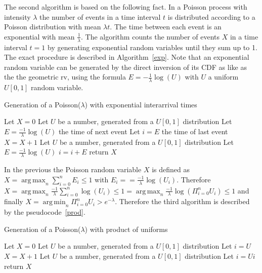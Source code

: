 \documentclass[10pt]{article}
\DeclareMathOperator*{\argmin}{arg\,min}
\DeclareMathOperator*{\argmax}{arg\,max}
\begin{document}
The second algorithm is based on the following fact. In a Poisson process with intensity $\lambda$ the number of events in a time interval $t$ is distributed according to a Poisson distribution with mean $\lambda t$. The time between each event is an exponential with mean $\frac{1}{\lambda}$. The algorithm counts the number of events $X$ in a time interval $t=1$ by generating exponential random variables until they sum up to 1. The exact procedure is described in Algorithm~\ref{exp}. Note that an exponential random variable can be generated by the direct inversion of its CDF as like as the the geometric rv, using the formula $E = -\frac{1}{\lambda} \log(U)$ with $U$ a uniform $U[0,1]$ random variable.

\begin{algorithm}
  \caption{Generation of a Poisson($\lambda$) with exponential interarrival times}\label{exp}
  \begin{algorithmic}[1]
    \Procedure{}{}
    \State Let $X = 0$
    \State Let $U$ be a number, generated from a $U[0,1]$ distribution
    \State Let $E = \frac{-1}{\lambda} \log(U)$ the time of next event
    \State Let $i = E$ the time of last event
    \State $X = X + 1$
    \State Let $U$ be a number, generated from a $U[0,1]$ distribution
    \State Let $E = \frac{-1}{\lambda} \log(U)$
    \State $i = i + E$
    \EndWhile
    \State return $X$
    \EndProcedure
  \end{algorithmic}
\end{algorithm}

In the previous the Poisson random variable $X$ is defined as $X = \argmax_n{\sum_{i = 0}^n E_i \le 1}$ with $E_i = = \frac{-1}{\lambda} \log(U_i)$. Therefore $X = \argmax_n{\frac{-1}{\lambda} \sum_{i = 0}^n \log(U_i) \le 1} = \argmax_n{\frac{-1}{\lambda} \log( \Pi_{i = 0}^n U_i ) \le 1}$ and finally $X = \argmin_n \Pi_{i = 0}^n U_i > e^{-\lambda}$. Therefore the third algorithm is described by the pseudocode~\ref{prod}.

\begin{algorithm}
  \caption{Generation of a Poisson($\lambda$) with product of uniforms}\label{prod}
  \begin{algorithmic}[1]
    \Procedure{}{}
    \State Let $X = 0$
    \State Let $U$ be a number, generated from a $U[0,1]$ distribution
    \State Let $i = U$
    \State $X = X + 1$
    \State Let $U$ be a number, generated from a $U[0,1]$ distribution
    \State Let $i = Ui$
    \EndWhile
    \State return $X$
    \EndProcedure
  \end{algorithmic}
\end{algorithm}
\end{document}
